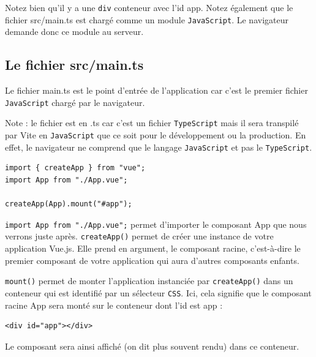 \documentclass{article}
\begin{document}
Notez bien qu'il y a une {\tt div} conteneur avec l'{\color{monOrange}id app}. Notez également que le fichier src/main.ts est chargé comme un module {\tt JavaScript}. Le navigateur demande donc ce module au serveur.

\subsection{Le fichier {\color{monOrange}src/main.ts}}
Le fichier {\color{monOrange}main.ts} est le point d'entrée de l'application car c'est le premier fichier {\tt JavaScript} chargé par le navigateur.

Note : le fichier est en {\color{monOrange}.ts} car c'est un fichier {\tt TypeScript} mais il sera transpilé par Vite en {\tt JavaScript} que ce soit pour le développement ou la production. En effet, le navigateur ne comprend que le langage {\tt JavaScript} et pas le {\tt TypeScript}.
\begin{verbatim}
import { createApp } from "vue";
import App from "./App.vue";

createApp(App).mount("#app");
\end{verbatim} 

{\tt import App from "./App.vue";} permet d'importer le composant {\color{monOrange}App} que nous verrons juste après. {\tt createApp()} permet de créer une instance de votre application {\color{monOrange}Vue.js}. Elle prend en argument, le composant racine, c'est-à-dire le premier composant de votre application qui aura d'autres composants enfants.

{\tt mount()} permet de monter l'application instanciée par {\tt createApp()} dans un conteneur qui est identifié par un sélecteur {\tt CSS}. Ici, cela signifie que le composant racine {\color{monOrange}App} sera monté sur le conteneur dont l'{\color{monOrange}id} est {\color{monOrange}app} :
\begin{verbatim}
<div id="app"></div>
\end{verbatim} 

Le composant sera ainsi affiché (on dit plus souvent rendu) dans ce conteneur.
\end{document}
